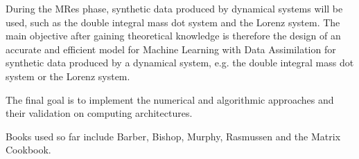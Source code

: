 \documentclass[english]{article}
\begin{document}
During the MRes phase, synthetic data produced by dynamical systems will be used, such as the double integral mass dot system and the Lorenz system. The main objective after gaining theoretical knowledge is therefore the design of an accurate and efficient model for Machine Learning with Data Assimilation for synthetic data produced by a dynamical system, e.g. the double integral mass dot system or the Lorenz system.

The final goal is to implement the numerical and algorithmic approaches and their validation on computing architectures.

Books used so far include Barber\cite{Barber}, Bishop\cite{Bishop},  Murphy\cite{Murphy}, Rasmussen\cite{Rasmussen} and the Matrix Cookbook\cite{Matrix}.


\end{document}
